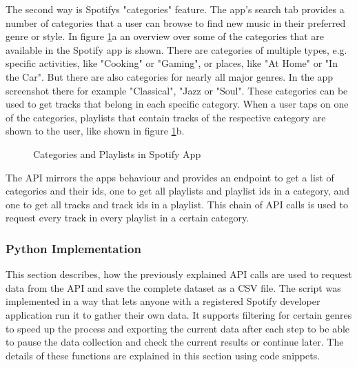 The second way is Spotifys "categories" feature. The app's search tab provides a number of
categories that a user can browse to find new music in their preferred genre or style.
In figure \ref{fig:Categories and Playlists in Spotify App}a an overview over some of the categories
that are available in the Spotify app is shown. There are categories of multiple types, e.g.
specific activities, like "Cooking" or "Gaming", or places, like "At Home" or "In the Car".
But there are also categories for nearly all major genres. In the app screenshot
there for example "Classical", "Jazz or "Soul".
These categories can be used to get tracks that belong in each specific category. When a user taps on
one of the categories, playlists that contain tracks of the respective category are shown to the user,
like shown in figure \ref{fig:Categories and Playlists in Spotify App}b.

\begin{figure}[H]
    \centering
    \qquad
    \caption{Categories and Playlists in Spotify App}%
    \label{fig:Categories and Playlists in Spotify App}%
\end{figure}

The API mirrors the apps behaviour and provides an endpoint to get a list of categories and their ids,
one to get all playlists and playlist ids in a category, and one to get all tracks and track ids in
a playlist. This chain of API calls is used to request every track in every playlist in a certain category.


\subsubsection{Python Implementation}

This section describes, how the previously explained API calls are used to request data from the API
and save the complete dataset as a CSV file. The script was implemented in a way that lets anyone with a registered Spotify
developer application run it to gather their own data.
It supports filtering for certain genres to speed up the process and exporting the current data after each step
to be able to pause the data collection and check the current results or continue later.
The details of these functions are explained in this section using code snippets.

